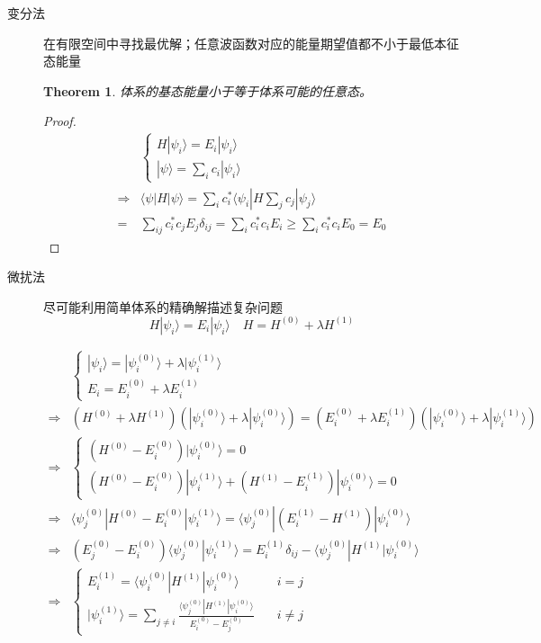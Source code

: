 \documentclass{article}
\newtheorem{theorem}{Theorem}[section]
\newtheorem{proof}{Proof}[section]
\numberwithin{equation}{section}
\newcommand{\ket}[1]{| #1 \rangle}
\newcommand{\bracket}[2]{\langle #1 | #2 \rangle}
\newcommand{\bracketl}[3]{\langle #1 | #2 | #3 \rangle}
\begin{document}
  \begin{description}
	  \item[变分法] 在有限空间中寻找最优解；任意波函数对应的能量期望值都不小于最低本征态能量

	  \begin{theorem}
	    体系的基态能量小于等于体系可能的任意态。
	  \end{theorem}

	  \begin{proof}
	    \begin{align}
	    &\begin{cases}
	    H\ket{\psi_i} = E_i\ket{\psi_i}\\
	    \ket{\psi}=\sum_i c_i \ket{\psi_i}
	    \end{cases}\\
	    \Rightarrow & \bracketl{\psi}{H}{\psi} = \sum_i c_i^* \bracketl{\psi_i}{H \sum_j c_j}{\psi_j} \\
	    =& \sum_{ij}c_i^*c_j E_j \delta_{ij}=\sum_i c_i^* c_i E_i \geq \sum_i c_i^* c_i E_{0}=E_{0}
	    \end{align}
	  \end{proof}

	  \item[微扰法] 尽可能利用简单体系的精确解描述复杂问题
	  \begin{equation}
	    H\ket{\psi_i}=E_i\ket{\psi_i} \quad H=H^{(0)} +\lambda H^{(1)}
	  \end{equation}

	  \begin{align*}
	    &\begin{cases}
	    \ket{\psi_i} = \ket{\psi_i^{(0)}}+\lambda \ket{\psi_i^{(1)}}\\
	    E_i=E_i^{(0)} + \lambda E_i^{(1)}
	    \end{cases}\\
	    \Rightarrow & (H^{(0)}+\lambda H^{(1)})(\ket{\psi^{(0)}_i}+\lambda \ket{\psi_i^{(0)}})=(E_i^{(0)}+\lambda E^{(1)}_i)(\ket   {\psi_i^{(0)}}+\lambda \ket{\psi^{(1)}_i}) \\
	    \Rightarrow & \begin{cases}
	    (H^{(0)}-E_i^{(0)})\ket{\psi_i^{(0)}}=0\\
	    (H^{(0)}-E_i^{(0)})\ket{\psi_i^{(1)}}+(H^{(1)}-E_i^{(1)})\ket{\psi_i^{(0)}} =0
	    \end{cases}\\
	    \Rightarrow & \bracketl{\psi_j^{(0)}}{H^{(0)}-E_i^{(0)}}{\psi_i^{(1)}}=\bracketl{\psi_j^{(0)}}{(E_i^{(1)}-H^{(1)})}{\psi_i^{  (0)}  }\\
	    \Rightarrow & (E_j^{(0)}-E_i^{(0)})\bracket{\psi_j^{(0)}}{\psi_i^{(1)}}=E_i^{(1)}\delta_{ij} -\bracketl{\psi^{(0)}_j}{H^{(1)}}    {\psi_i^{(0)}}\\
	    \Rightarrow &
	    \begin{cases}
	    E_i^{(1)}=\bracketl{\psi_i^{(0)}}{H^{(1)}}{\psi_i^{(0)}} &\quad i=j \\
	    \ket{\psi_i^{(1)}}=\sum_{j\neq i}\frac{\bracketl{\psi^{(0)}_j}{H^{(1)}}{\psi^{(0)}_i}}{E^{(0)}_i-E^{(0)}_j} &\quad i\neq j
	    \end{cases}
	  \end{align*}


\end{description}
\end{document}
